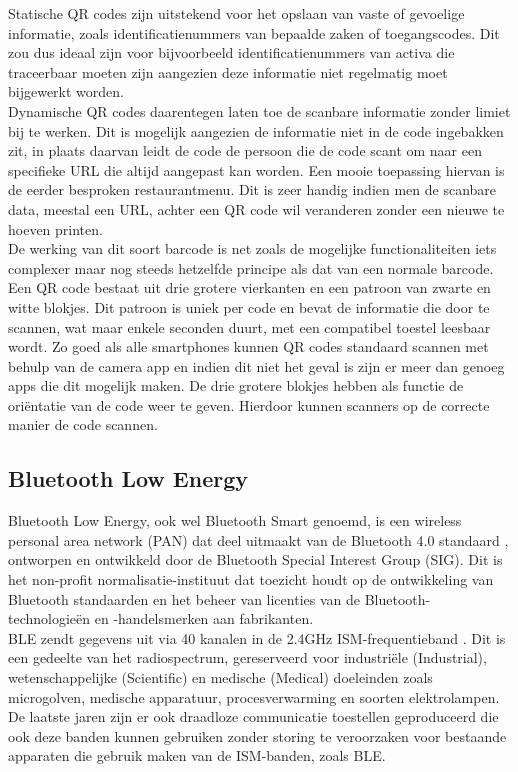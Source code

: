 Statische QR codes zijn uitstekend voor het opslaan van vaste of gevoelige informatie, zoals identificatienummers van bepaalde zaken of toegangscodes. Dit zou dus ideaal zijn voor bijvoorbeeld identificatienummers van activa die traceerbaar moeten zijn aangezien deze informatie niet regelmatig moet bijgewerkt worden. \\

Dynamische QR codes daarentegen laten toe de scanbare informatie zonder limiet bij te werken. Dit is mogelijk aangezien de informatie niet in de code ingebakken zit, in plaats daarvan leidt de code de persoon die de code scant om naar een specifieke URL die altijd aangepast kan worden. Een mooie toepassing hiervan is de eerder besproken restaurantmenu. Dit is zeer handig indien men de scanbare data, meestal een URL, achter een QR code wil veranderen zonder een nieuwe te hoeven printen. \\

De werking van dit soort barcode is net zoals de mogelijke functionaliteiten iets complexer maar nog steeds hetzelfde principe als dat van een normale barcode. Een QR code bestaat uit drie grotere vierkanten en een patroon van zwarte en witte blokjes. Dit patroon is uniek per code en bevat de informatie die door te scannen, wat maar enkele seconden duurt, met een compatibel toestel leesbaar wordt. Zo goed als alle smartphones kunnen QR codes standaard scannen met behulp van de camera app en indien dit niet het geval is zijn er meer dan genoeg apps die dit mogelijk maken. De drie grotere blokjes hebben als functie de oriëntatie van de code weer te geven. Hierdoor kunnen scanners op de correcte manier de code scannen.

\subsection{Bluetooth Low Energy}
Bluetooth Low Energy, ook wel Bluetooth Smart genoemd, is een wireless personal area network (PAN) dat deel uitmaakt van de Bluetooth 4.0 standaard \autocite{Bluetooth2022}, ontworpen en ontwikkeld door de Bluetooth Special Interest Group (SIG). Dit is het non-profit normalisatie-instituut dat toezicht houdt op de ontwikkeling van Bluetooth standaarden en het beheer van licenties van de Bluetooth-technologieën en -handelsmerken aan fabrikanten. \\

BLE zendt gegevens uit via 40 kanalen in de 2.4GHz ISM-frequentieband \autocite{Kumbhar2017}. Dit is een gedeelte van het radiospectrum, gereserveerd voor industriële (Industrial), wetenschappelijke (Scientific) en medische (Medical) doeleinden zoals microgolven, medische apparatuur, procesverwarming en soorten elektrolampen. De laatste jaren zijn er ook draadloze communicatie toestellen geproduceerd die ook deze banden kunnen gebruiken zonder storing te veroorzaken voor bestaande apparaten die gebruik maken van de ISM-banden, zoals BLE.\\


